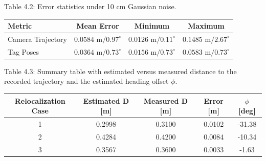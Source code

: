 \begin{frame}[label=appendix-table-42]{Table 4.2: Error statistics under 10 cm Gaussian noise.}
\small
\centering
\begin{tabular}{|l|c|c|c|}
\hline
\textbf{Metric} & \textbf{Mean Error} & \textbf{Minimum} & \textbf{Maximum} \\ \hline
Camera Trajectory & $0.0584\text{ m} / 0.97^\circ$ & $0.0126\text{ m} / 0.11^\circ$ & $0.1485\text{ m} / 2.67^\circ$ \\ \hline
Tag Poses & $0.0364\text{ m} / 0.73^\circ$ & $0.0156\text{ m} / 0.73^\circ$ & $0.0583\text{ m} / 0.73^\circ$ \\ \hline
\end{tabular}
\end{frame}

\begin{frame}[label=appendix-table-43]{Table 4.3: Summary table with estimated versus measured distance to the recorded trajectory and the estimated heading offset $\phi$.}
\small
\centering
\begin{tabular}{|c|c|c|c|c|}
\hline
\textbf{Relocalization Case} & \textbf{Estimated D [m]} & \textbf{Measured D [m]} & \textbf{Error [m]} & \textbf{$\phi$ [deg]} \\ \hline
1 & 0.2998 & 0.3100 & 0.0102 & -31.38 \\ \hline
2 & 0.4284 & 0.4200 & 0.0084 & -10.34 \\ \hline
3 & 0.3567 & 0.3600 & 0.0033 & -1.63 \\ \hline
\end{tabular}
\end{frame}

